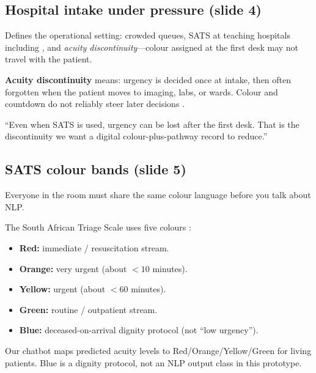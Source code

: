 \subsection{Hospital intake under pressure (slide 4)}

\begin{whybox}
Defines the operational setting: crowded queues, SATS at teaching hospitals including
\examplehospital{}, and \emph{acuity discontinuity}---colour assigned at the first desk may not travel with the patient.
\end{whybox}

\textbf{Acuity discontinuity} means: urgency is decided once at intake, then often forgotten when the patient moves to imaging, labs, or wards. Colour and countdown do not reliably steer later decisions \citep{Rominski2014,kathsats}.

\begin{saybox}
``Even when SATS is used, urgency can be lost after the first desk. That is the discontinuity we want a digital colour-plus-pathway record to reduce.''
\end{saybox}

\subsection{SATS colour bands (slide 5)}

\begin{whybox}
Everyone in the room must share the same colour language before you talk about NLP.
\end{whybox}

\begin{definition}
The South African Triage Scale uses five colours \citep{satsmanual}:
\begin{itemize}[nosep]
  \item \textbf{Red:} immediate / resuscitation stream.
  \item \textbf{Orange:} very urgent (about \(<10\) minutes).
  \item \textbf{Yellow:} urgent (about \(<60\) minutes).
  \item \textbf{Green:} routine / outpatient stream.
  \item \textbf{Blue:} deceased-on-arrival dignity protocol (not ``low urgency'').
\end{itemize}
\end{definition}

Our chatbot maps predicted acuity levels to Red/Orange/Yellow/Green for living patients.
Blue is a dignity protocol, not an NLP output class in this prototype.


